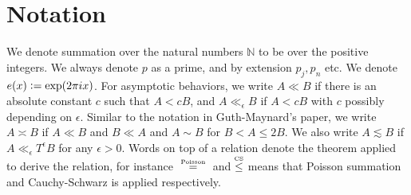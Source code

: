 \section*{Notation}
We denote summation over the natural numbers $\mathbb{N}$ to be over the positive integers. We always denote $p$ as a prime, and by extension $p_j,p_n$ etc. We denote $e(x)\mathrel{\mathop:}= \exp(2\pi i x)$. For asymptotic behaviors, we write $A\ll B$ if there is an absolute constant $c$ such that $A<cB$, and $A\ll_{\epsilon} B$ if $A<cB$ with $c$ possibly depending on $\epsilon$. Similar to the notation in Guth-Maynard's paper, we write $A\asymp B$ if $A\ll B$ and $B\ll A$ and $A\sim B$ for $B< A\leq 2B$. We also write $A\lesssim B$ if $A\ll_{\epsilon} T^\epsilon B$ for any $\epsilon>0$. Words on top of a relation denote the theorem applied to derive the relation, for instance $\quad\stackeq{Poisson}\quad$ and $\stackon{CS}{\leq}$ means that Poisson summation and Cauchy-Schwarz is applied respectively.
